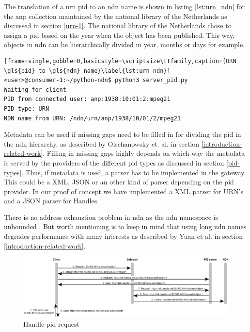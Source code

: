 The translation of a \gls{urn} \gls{pid} to an \gls{ndn} name is shown in listing \ref{lst:urn_ndn} for the \gls{anp} collection maintained by the national library of the Netherlands as discussed in section \ref{urn-1}. The national library of the Netherlands chose to assign a \gls{pid} based on the year when the object has been published. 
This way, objects in \gls{ndn} can be hierarchically divided in year, months or days for example.
\vspace{1em}
\begin{lstlisting}[frame=single,gobble=0,basicstyle=\scriptsize\ttfamily,caption={URN \gls{pid} to \gls{ndn} name}\label{lst:urn_ndn}]
<user>@consumer-1:~/python-ndn$ python3 server_pid.py
Waiting for client
PID from connected user: anp:1938:10:01:2:mpeg21
PID type: URN
NDN name from URN: /ndn/urn/anp/1938/10/01/2/mpeg21
\end{lstlisting}

Metadata can be used if missing gaps need to be filled in for dividing the \gls{pid} in the \gls{ndn} hierarchy, as described by Olschanowsky et. al. \cite{ndn-clim} in section \ref{introduction-related-work}. 
Filling in missing gaps highly depends on which way the metadata is served by the providers of the different \gls{pid} types as discussed in section \ref{pid-types}. Thus, if metadata is used, a parser has to be implemented in the gateway. This could be a XML, JSON or an other kind of parser depending on the \gls{pid} provider. In our proof of concept we have implemented a XML parser for URN's and a JSON parser for Handles.

There is no address exhaustion problem in \gls{ndn} as the \gls{ndn} namespace is unbounded \cite{ndn-nspace}. But worth mentioning is to keep in mind that using long \gls{ndn} names degrades performance with many interests as described by Yuan et al. \cite{yuan2012scalable} in section \ref{introduction-related-work}.

\begin{figure}[H]
    \centering
    \includegraphics[width=\textwidth]{Images/pid_seq5.png}
    \caption{Handle \gls{pid} request\label{fig:seq_pid}}
\end{figure}


